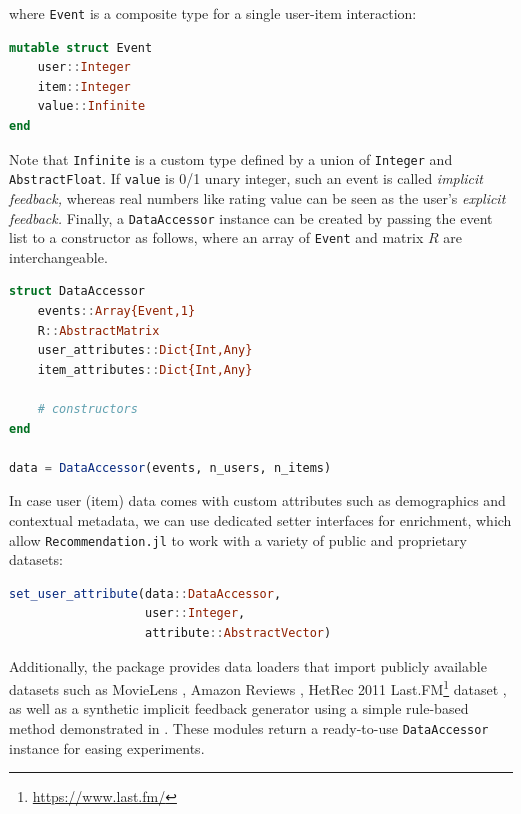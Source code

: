 where \texttt{Event} is a composite type for a single user-item interaction:

\begin{lstlisting}[language = Julia]
mutable struct Event
    user::Integer
    item::Integer
    value::Infinite
end
\end{lstlisting}

Note that \texttt{Infinite} is a custom type defined by a union of \texttt{Integer} and \texttt{AbstractFloat}. If \texttt{value} is 0/1 unary integer, such an event is called \textit{implicit feedback,} whereas real numbers like rating value can be seen as the user's \textit{explicit feedback.} Finally, a \texttt{DataAccessor} instance can be created by passing the event list to a constructor as follows, where an array of \texttt{Event} and matrix $R$ are interchangeable.

\begin{lstlisting}[language = Julia]
struct DataAccessor
    events::Array{Event,1}
    R::AbstractMatrix
    user_attributes::Dict{Int,Any}
    item_attributes::Dict{Int,Any}
    
    # constructors
end

data = DataAccessor(events, n_users, n_items)
\end{lstlisting}

In case user (item) data comes with custom attributes such as demographics and contextual metadata, we can use dedicated setter interfaces for enrichment, which allow \texttt{Recommendation.jl} to work with a variety of public and proprietary datasets:

\begin{lstlisting}[language = Julia]
set_user_attribute(data::DataAccessor, 
                   user::Integer, 
                   attribute::AbstractVector)
\end{lstlisting}

Additionally, the package provides data loaders that import publicly available datasets such as MovieLens \cite{harper2015movielens}, Amazon Reviews \cite{ni2019justifying}, HetRec 2011 Last.FM\footnote{\url{https://www.last.fm/}} dataset \cite{Cantador:RecSys2011}, as well as a synthetic implicit feedback generator using a simple rule-based method demonstrated in \cite{Aharon2013}. These modules return a ready-to-use \texttt{DataAccessor} instance for easing experiments.
